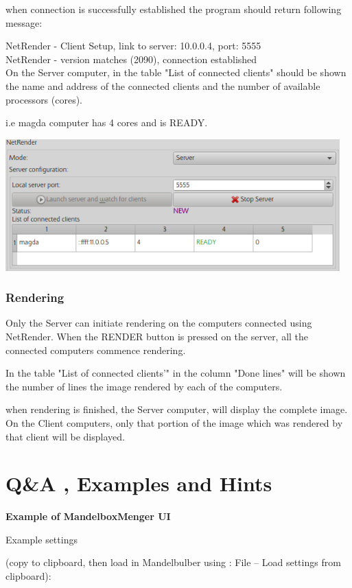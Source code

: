 when connection is successfully established the program should return following
message:

NetRender - Client Setup, link to server: 10.0.0.4, port: 5555\\ NetRender -
version matches (2090), connection established\\[2\baselineskip]On the Server
computer, in the table "List of connected clients" should be shown the name and
address of the connected clients and the number of available processors (cores).

i.e magda computer has 4 cores and is READY.

\includegraphics[width=5.07283in,height=1.99843in]{img/manual/media/image30.png}

\subsubsection{Rendering}\label{rendering}

Only the Server can initiate rendering on the computers connected using
NetRender. When the RENDER button is pressed on the server, all the connected
computers commence rendering.

In the table "List of connected clients'" in the column "Done lines" will be
shown the number of lines the image rendered by each of the computers.

when rendering is finished, the Server computer, will display the complete
image. On the Client computers, only that portion of the image which was
rendered by that client will be displayed.

\section{Q\&A , Examples and Hints}\label{qa-examples-and-hints}

\textbf{Example of MandelboxMenger UI}

Example settings

(copy to clipboard, then load in Mandelbulber using : File -- Load settings from
clipboard):

